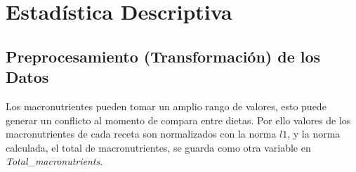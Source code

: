 \documentclass[12pt,a4paper]{article}
\begin{document}
    \section{Estadística Descriptiva}\label{sec:eda}
    {
        \subsection{Preprocesamiento (Transformación) de los Datos}\label{subsec:trans_datos}
        {
            Los macronutrientes pueden tomar un amplio rango 
            de valores, esto puede generar un conflicto al momento de compara 
            entre dietas. 
            Por ello valores de los macronutrientes de cada receta son 
            normalizados con la norma $l1$, y la norma calculada, el total de macronutrientes,
            se guarda como otra variable en \emph{Total\_macronutrients}.\cite{beta_distribution}

}}
\end{document}
